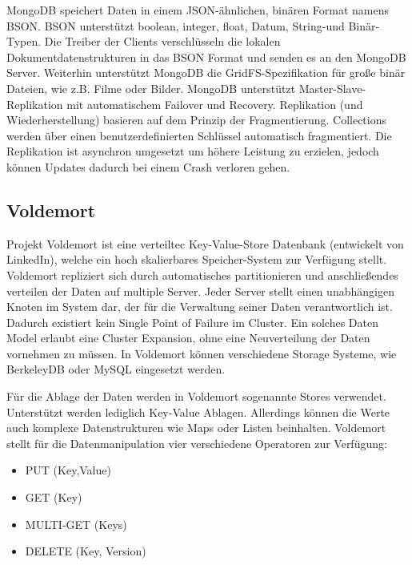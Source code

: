 MongoDB speichert Daten in einem JSON-ähnlichen, binären Format namens BSON. BSON unterstützt boolean, integer, float, Datum, String-und Binär-Typen. Die Treiber der Clients verschlüsseln die lokalen Dokumentdatenstrukturen in das BSON Format und senden es an den MongoDB Server. Weiterhin unterstützt MongoDB die GridFS-Spezifikation für große binär Dateien, wie z.B. Filme oder Bilder. MongoDB unterstützt Master-Slave-Replikation mit automatischem Failover und Recovery. Replikation (und Wiederherstellung) basieren auf dem Prinzip der Fragmentierung. Collections werden über einen benutzerdefinierten Schlüssel automatisch fragmentiert. Die Replikation ist asynchron umgesetzt um höhere Leistung zu erzielen, jedoch können Updates dadurch bei einem Crash verloren gehen. 

\subsection{Voldemort}
\label{ch:AnalyseDatenbanken:sec:Datenbanken:subsec:Voldemort}

Projekt Voldemort \cite{vod2013} ist eine verteiltec Key-Value-Store Datenbank (entwickelt von LinkedIn), welche ein hoch skalierbares Speicher-System zur Verfügung stellt. Voldemort repliziert sich durch automatisches partitionieren und anschließendes verteilen der Daten auf multiple Server. Jeder Server stellt einen unabhängigen Knoten im System dar, der für die Verwaltung seiner Daten verantwortlich ist. Dadurch existiert kein Single Point of Failure im Cluster. Ein solches Daten Model erlaubt eine Cluster Expansion, ohne eine Neuverteilung der Daten vornehmen zu müssen. In Voldemort können verschiedene Storage Systeme, wie BerkeleyDB oder MySQL eingesetzt werden. 

Für die Ablage der Daten werden in Voldemort sogenannte Stores verwendet. Unterstützt werden lediglich Key-Value Ablagen. Allerdings können die Werte auch komplexe Datenstrukturen wie Maps oder Listen beinhalten. Voldemort stellt für die Datenmanipulation vier verschiedene Operatoren zur Verfügung:

\begin{itemize}

	\item PUT (Key,Value)
	\item GET (Key)
	\item MULTI-GET (Keys)
	\item DELETE (Key, Version) 

\end{itemize}

